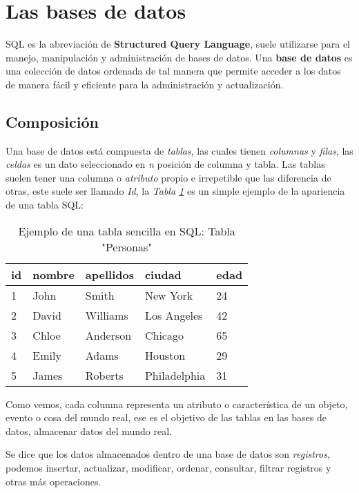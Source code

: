 \section{Las bases de datos}

SQL es la abreviación de \textbf{Structured Query Language}, suele utilizarse para el manejo, manipulación y administración de bases de datos. Una \textbf{base de datos} es una colección de datos ordenada de tal manera que permite acceder a los datos de manera fácil y eficiente para la administración y actualización.


\subsection{Composición}

Una base de datos está compuesta de \textit{tablas}, las cuales tienen \textit{columnas} y \textit{filas}, las \textit{celdas} es un dato seleccionado en \textit{n} posición de columna y tabla. Las tablas suelen tener una columna o \textit{atributo} propio e irrepetible que las diferencia de otras, este suele ser llamado \textit{Id}, la \textit{Tabla \ref{tab: 1}} es un simple ejemplo de la apariencia de una tabla SQL:
\begin{table}[H]
    \centering
    \caption{Ejemplo de una tabla sencilla en SQL: Tabla "Personas"}
    \label{tab: 1}
    \begin{tabular}{|l|l|l|l|l|}
        \hline
        \textbf{id} & \textbf{nombre} & \textbf{apellidos} & \textbf{ciudad} & \textbf{edad} \\
        \hline
        1 & John    & Smith     & New York      & 24 \\
        \hline
        2 & David   & Williams  & Los Angeles   & 42 \\
        \hline
        3 & Chloe   & Anderson  & Chicago       & 65 \\
        \hline
        4 & Emily   & Adams     & Houston       & 29 \\
        \hline
        5 & James   & Roberts   & Philadelphia  & 31 \\
        \hline
    \end{tabular}
\end{table}

Como vemos, cada columna representa un atributo o característica de un objeto, evento o cosa del mundo real, ese es el objetivo de las tablas en las bases de datos, almacenar datos del mundo real.

Se dice que los datos almacenados dentro de una base de datos son \textit{registros}, podemos insertar, actualizar, modificar, ordenar, consultar, filtrar registros y otras más operaciones.


